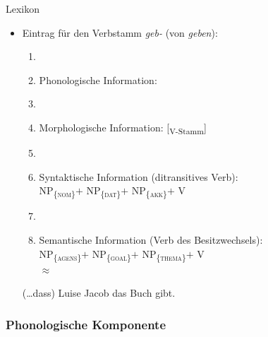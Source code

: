 \begin{frame}{Lexikon}
			
\begin{itemize}
	\item Eintrag für den Verbstamm \emph{geb-} (von \emph{geben}): 

	\begin{enumerate}
		\item[]
		\item Phonologische Information: 
		\item[]
		\item Morphologische Information: [\textsubscript{V-Stamm}] 
		\item[]
		\item Syntaktische Information (ditransitives Verb):\\
			NP\textsubscript{\{\textsc{nom}\}}$+$
			NP\textsubscript{\{\textsc{dat}\}}$+$
			NP\textsubscript{\{\textsc{akk}\}}$+$
			V
					
		\item[]
		\item Semantische Information (Verb des Besitzwechsels):\\
			NP\textsubscript{\{\textsc{agens}\}}$+$
			NP\textsubscript{\{\textsc{goal}\}}$+$
			NP\textsubscript{\{\textsc{thema}\}}$+$
			V \\
			$\approx$
	\end{enumerate}		  


\ea (\dots dass) Luise Jacob das Buch gibt.
\z 
\end{itemize}

\end{frame}


\subsubsection{Phonologische Komponente}

